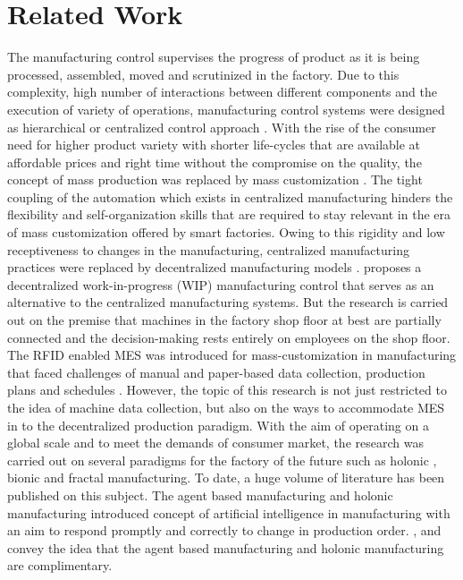 \documentclass[10pt,conference,compsocconf]{IEEEtran}
\begin{document}
\section{Related Work}
The manufacturing control supervises the progress of product as it is being processed, assembled, moved and scrutinized in the factory. Due to this complexity, high number of interactions between different components and the execution of variety of operations, manufacturing control systems were designed as hierarchical or centralized control approach \cite{Leitao:2009:Agent-Based}. With the rise of the consumer need for higher product variety with shorter life-cycles that are available at affordable prices and right time without the compromise on the quality, the concept of mass production was replaced by mass customization \cite{Pine:1992:Mass_Customization}. The tight coupling of the automation which exists in centralized manufacturing hinders the flexibility and self-organization skills that are required to stay relevant in the era of mass customization offered by smart factories. Owing to this rigidity and low receptiveness to changes in the manufacturing, centralized manufacturing practices were replaced by decentralized manufacturing models \cite{Ueda_Lengyel:2004:Emergent_Synthesis}. \cite{Loedding_Yu:2003:Decentralized_WIP-oriented} proposes a decentralized work-in-progress (WIP) manufacturing control that serves as an alternative to the centralized manufacturing systems. But the research is carried out on the premise that machines in the factory shop floor at best are partially connected and the decision-making rests entirely on employees on the shop floor. The RFID enabled MES was introduced for mass-customization in manufacturing that faced challenges of manual and paper-based data collection, production plans and schedules \cite{Zhong_Dai:2012:RFID_enabled}. However, the topic of this research is not just restricted to the idea of machine data collection, but also on the ways to accommodate MES in to the decentralized production paradigm.  With the aim of operating on a global scale and to meet the demands of consumer market, the research was carried out on several paradigms for the factory of the future such as holonic \cite{Colombo_Neubert:2006:An_Agent}, bionic \cite{Ueda:1992:A_Concept} and 
fractal \cite{Warnecke:1993:The_Fractal} manufacturing. To date, a huge volume of literature has been published on this subject. The agent based manufacturing \cite{Leitao:2009:Agent-Based} and holonic manufacturing introduced concept of artificial intelligence in manufacturing with an aim to respond promptly and correctly to change in production order. \cite{Leitao:2009:Agent-Based}, \cite{Lim_Zhang:2003:A_multi_agent} and \cite{Colombo_Neubert:2006:An_Agent} convey the idea that the agent based manufacturing and holonic manufacturing are complimentary.
\end{document}
